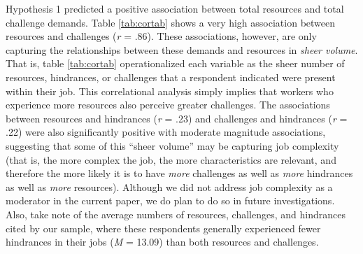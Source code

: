 \documentclass[
  man]{apa6}
\begin{document}
Hypothesis 1 predicted a positive association between total resources and total challenge demands. Table \ref{tab:cortab} shows a very high association between resources and challenges (\emph{r} = .86). These associations, however, are only capturing the relationships between these demands and resources in \emph{sheer volume}. That is, table \ref{tab:cortab} operationalized each variable as the sheer number of resources, hindrances, or challenges that a respondent indicated were present within their job. This correlational analysis simply implies that workers who experience more resources also perceive greater challenges. The associations between resources and hindrances (\emph{r} = .23) and challenges and hindrances (\emph{r} = .22) were also significantly positive with moderate magnitude associations, suggesting that some of this ``sheer volume'' may be capturing job complexity (that is, the more complex the job, the more characteristics are relevant, and therefore the more likely it is to have \emph{more} challenges as well as \emph{more} hindrances as well as \emph{more} resources). Although we did not address job complexity as a moderator in the current paper, we do plan to do so in future investigations. Also, take note of the average numbers of resources, challenges, and hindrances cited by our sample, where these respondents generally experienced fewer hindrances in their jobs (\emph{M} = 13.09) than both resources and challenges.
\end{document}
